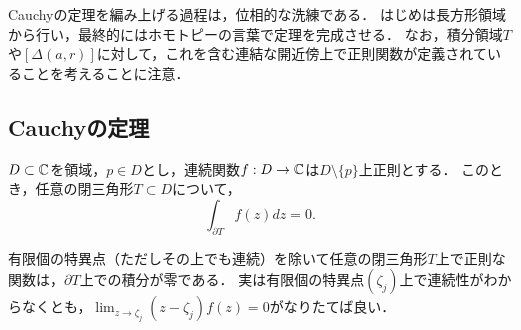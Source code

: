 \documentclass[uplatex, dvipdfmx]{jsreport}
\begin{document}
\begin{tcolorbox}[colframe=ForestGreen, colback=ForestGreen!10!white,breakable,colbacktitle=ForestGreen!40!white,coltitle=black,fonttitle=\bfseries\sffamily,
title=]
    Cauchyの定理を編み上げる過程は，位相的な洗練である．
    はじめは長方形領域から行い，最終的にはホモトピーの言葉で定理を完成させる．
    なお，積分領域$T$や$[\Delta(a,r)]$に対して，これを含む連結な開近傍上で正則関数が定義されていることを考えることに注意．
\end{tcolorbox}

\subsection{Cauchyの定理}

\begin{lemma}[閉三角形領域に対するCauchyの定理]
    $D\subset\mathbb{C}$を領域，$p\in D$とし，連続関数$f:D\to\mathbb{C}$は$D\setminus\{p\}$上正則とする．
    このとき，任意の閉三角形$T\subset D$について，
    \[\int_{\partial T}f(z)dz=0.\]
\end{lemma}
\begin{remarks}
    有限個の特異点（ただしその上でも連続）を除いて任意の閉三角形$T$上で正則な関数は，$\partial T$上での積分が零である．
    実は有限個の特異点$(\zeta_j)$上で連続性がわからなくとも，$\lim_{z\to\zeta_j}(z-\zeta_j)f(z)=0$がなりたてば良い．
\end{remarks}
\end{document}
